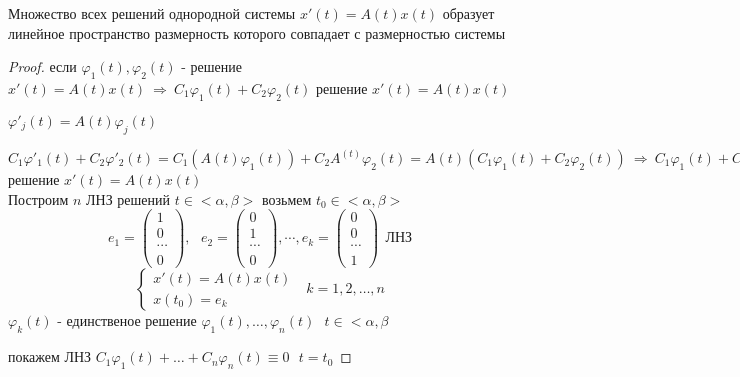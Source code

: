 \begin{theorem}
  Множество всех решений однородной системы $x'(t) = A(t)x(t)$ образует
  линейное пространство размерность которого совпадает с размерностью системы
\end{theorem}

\begin{proof}
  если $\varphi_1(t), \varphi_2(t)$ - решение $x'(t) = A(t)x(t) ~ \Rightarrow ~
  C_1\varphi_1(t) + C_2\varphi_2(t)$ решение $x'(t) = A(t)x(t)$

  $\varphi'_j(t) = A(t)\varphi_j(t)$

  $C_1 \varphi'_1(t) + C_2 \varphi'_2(t) = C_1(A(t) \varphi_1(t)) +
  C_2A^{(t)}\varphi_2(t) = A(t)(C_1\varphi_1(t) + C_2\varphi_2(t)) ~
  \Rightarrow ~ C_1 \varphi_1(t) + C_2 \varphi_2(t)$ решение
  $x'(t) = A(t)x(t)$\\

  Построим $n$ ЛНЗ решений $t \in <\alpha, \beta>$ возьмем $t_0 \in
  <\alpha, \beta>$
  $$
  e_1 =
  \left(
  \begin{array}{c}
    1 \\
    0 \\
    \cdots \\
    0
  \end{array}
  \right), ~~~
  e_2 =
  \left(
  \begin{array}{c}
    0 \\
    1 \\
    \cdots \\
    0
  \end{array}
  \right), \cdots,
  e_k =
  \left(
  \begin{array}{c}
    0 \\
    0 \\
    \cdots \\
    1
  \end{array}
  \right) ~~ \text{ЛНЗ}
  $$
  $$
  \left\{
  \begin{array}{c}
    x'(t) = A(t)x(t) \\
    x(t_0) = e_k
  \end{array}
  \right. ~~~ k = 1, 2, \ldots, n
  $$
  $\varphi_k(t)$ - единственое решение $\varphi_1(t), \ldots, \varphi_n(t) ~~~
  t \in <\alpha, \beta$

  покажем ЛНЗ $C_1 \varphi_1(t) + \ldots + C_n \varphi_n(t) \equiv 0 ~~~
  t = t_0$


\end{proof}
